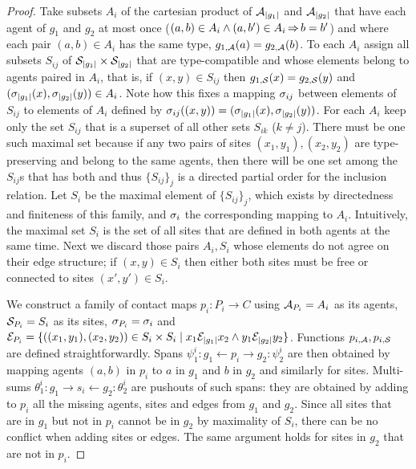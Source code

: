 \begin{proof}
  Take subsets $A_i$ of the cartesian product
  of $\mathcal{A}_{\left|g_1\right|}$ and $\mathcal{A}_{\left|g_2\right|}$
  that have each agent of $g_1$ and $g_2$ at most once
  ($(a,b) \in A_i \wedge (a,b') \in A_i \operatorname*{\Rightarrow} b = b'$)
  and where each pair $(a,b) \in A_i$ has the same type,
  \ie $g_{1,\mathcal{A}}(a) = g_{2,\mathcal{A}}(b)$.
  To each $A_i$ assign all subsets $S_{ij}$ of
  $\mathcal{S}_{\left|g_1\right|} \times \mathcal{S}_{\left|g_2\right|}$
  that are type-compatible
  and whose elements belong to agents paired in $A_i$,
  that is, if $(x,y) \in S_{ij}$
  then $g_{1,\mathcal{S}}(x) = g_{2,\mathcal{S}}(y)$
  and $(\sigma_{\left|g_1\right|}(x),\sigma_{\left|g_2\right|}(y)) \in A_i$.
  Note how this fixes a mapping $\sigma_{ij}$
  between elements of $S_{ij}$ to elements of $A_i$
  defined by
  $\sigma_{ij}((x,y)) =
     (\sigma_{\left|g_1\right|}(x),\sigma_{\left|g_2\right|}(y))$.
  For each $A_i$ keep only the set $S_{ij}$
  that is a superset of all other sets $S_{ik}$ ($k \neq j$).
  There must be one such maximal set because
  if any two pairs of sites $(x_1,y_1),(x_2,y_2)$
  are type-preserving and belong to the same agents,
  then there will be one set among the $S_{ij}$s that has both
  and thus $\{S_{ij}\}_j$ is a directed partial order
  for the inclusion relation.
  Let $S_i$ be the maximal element of $\{S_{ij}\}_j$,
  which exists by directedness and finiteness of this family,
  and $\sigma_i$ the corresponding mapping to $A_i$.
  Intuitively, the maximal set $S_i$ is the set of all sites
  that are defined in both agents at the same time.
  Next we discard those pairs $A_i,S_i$
  whose elements do not agree on their edge structure;
  if $(x,y) \in S_i$ then either both sites must be free
  or connected to sites $(x',y') \in S_i$.

  We construct a family of contact maps $p_i: P_i \to C$
  using $\mathcal{A}_{P_i} = A_i$ as its agents,
  $\mathcal{S}_{P_i} = S_i$ as its sites,
  $\sigma_{P_i} = \sigma_i$ and
  $\mathcal{E}_{P_i} = \{((x_1,y_1), (x_2,y_2)) \in S_i \times S_i \; | \;
     x_1 \mathcal{E}_{\left|g_1\right|} x_2 \wedge
     y_1 \mathcal{E}_{\left|g_2\right|} y_2\}$.
  Functions $p_{i,\mathcal{A}},p_{i,\mathcal{S}}$
  are defined straightforwardly.
  Spans $\psi^i_1: g_1 \gets p_i \to g_2 :\psi^i_2$
  are then obtained by mapping agents $(a,b)$ in $p_i$
  to $a$ in $g_1$ and $b$ in $g_2$
  and similarly for sites.
  Multi-sums $\theta^i_1: g_1 \to s_i \gets g_2 :\theta^i_2$
  are pushouts of such spans:
  they are obtained by adding to $p_i$
  all the missing agents, sites and edges from $g_1$ and $g_2$.
  Since all sites that are in $g_1$ but not in $p_i$
  cannot be in $g_2$ by maximality of $S_i$,
  there can be no conflict when adding sites or edges.
  The same argument holds for sites in $g_2$ that are not in $p_i$.


\end{proof}
